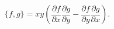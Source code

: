 \begin{equation}
    \label{eq:quadraticP}
    \{f, g\} 
    = xy \left(
        \frac{\partial f}{\partial x}
        \frac{\partial g}{\partial y}
        -
        \frac{\partial f}{\partial y}
        \frac{\partial g}{\partial x}
    \right).
\end{equation}

